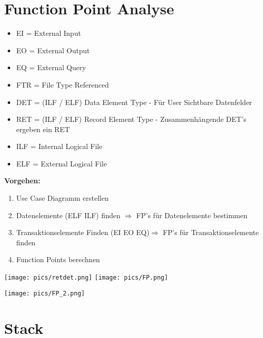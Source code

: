 \section{Function Point Analyse}
\begin{itemize}
\itemsep0em
\item EI = External Input
\item EO = External Output
\item EQ = External Query
\item FTR = File Type Referenced
\item DET = (ILF / ELF) Data Element Type - Für User Sichtbare Datenfelder
\item RET = (ILF / ELF) Record Element Type - Zusammenhängende DET's ergeben ein RET
\item ILF = Internal Logical File
\item ELF = External Logical File
\end{itemize}

\textbf{Vorgehen:}
\begin{enumerate}
\itemsep0em
\item Use Case Diagramm erstellen
\item Datenelemente (ELF ILF) finden $\Rightarrow $ FP's für Datenelemente bestimmen
\item Transaktionselemente Finden (EI EO EQ)$\Rightarrow $ FP's für Transaktionselemente finden
\item Function Points berechnen
\end{enumerate}
\texttt{[image: pics/retdet.png]}
\texttt{[image: pics/FP.png]}

\texttt{[image: pics/FP\_2.png]}
\newpage
\section{Stack}
\begin{minipage}[t]{0.49\textwidth}



\end{minipage}\hfill
\begin{minipage}[t]{0.49\textwidth}

\end{minipage}

\begin{minipage}[t]{0.49\textwidth}

\end{minipage}\hfill
\begin{minipage}[t]{0.49\textwidth}



\end{minipage}